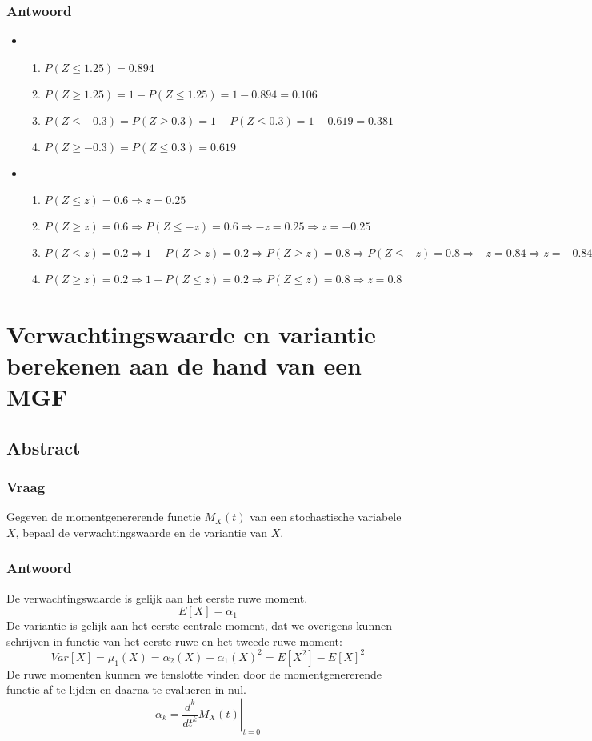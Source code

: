 \documentclass[main.tex]{subfiles}
\begin{document}
\subsubsection*{Antwoord}
\begin{itemize}
\item
  \begin{enumerate}
  \item $P(Z \le 1.25) = 0.894$
  \item $P(Z \ge 1.25) = 1-P(Z \le 1.25) = 1- 0.894 = 0.106$
  \item $P(Z \le -0.3) = P(Z \ge 0.3) = 1- P(Z \le 0.3) = 1-0.619 = 0.381$
  \item $P(Z \ge -0.3) = P(Z \le 0.3) = 0.619$
  \end{enumerate}
\item
  \begin{enumerate}
  \item $P(Z \le z) = 0.6 \Rightarrow z = 0.25$
  \item $P(Z \ge z) = 0.6 \Rightarrow P(Z \le -z) = 0.6 \Rightarrow -z = 0.25 \Rightarrow z = -0.25$ 
  \item $P(Z \le z) = 0.2 \Rightarrow 1-P(Z \ge z) = 0.2 \Rightarrow P(Z \ge z) = 0.8 \Rightarrow P(Z \le -z) = 0.8 \Rightarrow -z = 0.84 \Rightarrow z = -0.84$
  \item $P(Z \ge z) = 0.2 \Rightarrow 1-P(Z \le z) = 0.2 \Rightarrow P(Z \le z) = 0.8 \Rightarrow z = 0.8$
  \end{enumerate}
\end{itemize}

\newpage
\section{Verwachtingswaarde en variantie berekenen aan de hand van een MGF}
\subsection*{Abstract}
\subsubsection*{Vraag}
Gegeven de momentgenererende functie $M_{X}(t)$ van een stochastische variabele $X$, bepaal de verwachtingswaarde en de variantie van $X$.

\subsubsection*{Antwoord}
De verwachtingswaarde is gelijk aan het eerste ruwe moment.
\[ E[X] = \alpha_{1} \]
De variantie is gelijk aan het eerste centrale moment, dat we overigens kunnen schrijven in functie van het eerste ruwe en het tweede ruwe moment:
\[ Var[X] = \mu_{1}(X) = \alpha_{2}(X) - \alpha_{1}(X)^{2} = E[X^{2}] - E[X]^{2} \]
De ruwe momenten kunnen we tenslotte vinden door de momentgenererende functie af te lijden en daarna te evalueren in nul.
\[ \alpha_{k} = \left.\frac{d^{k}}{dt^{k}}M_{X}(t)\right|_{t=0} \]
\end{document}
